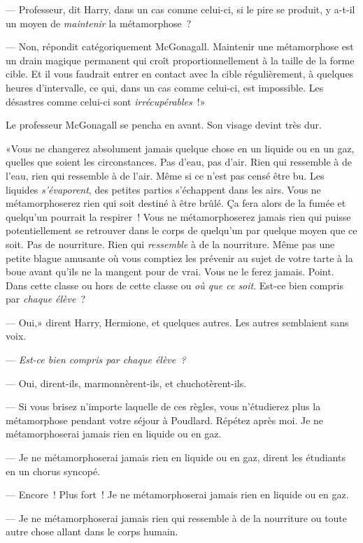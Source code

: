 --- Professeur, dit Harry, dans un cas comme celui-ci, si le pire se produit, y a-t-il un moyen de \emph{maintenir} la métamorphose~?

--- Non, répondit catégoriquement McGonagall. Maintenir une métamorphose est un drain magique permanent qui croît proportionnellement à la taille de la forme cible. Et il vous faudrait entrer en contact avec la cible régulièrement, à quelques heures d'intervalle, ce qui, dans un cas comme celui-ci, est impossible. Les désastres comme celui-ci sont \emph{irrécupérables}~!»

Le professeur McGonagall se pencha en avant. Son visage devint très dur.

«Vous ne changerez absolument jamais quelque chose en un liquide ou en un gaz, quelles que soient les circonstances. Pas d'eau, pas d'air. Rien qui ressemble à de l'eau, rien qui ressemble à de l'air. Même si ce n'est pas censé être bu. Les liquides \emph{s'évaporent}, des petites parties s'échappent dans les airs. Vous ne métamorphoserez rien qui soit destiné à être brûlé. Ça fera alors de la fumée et quelqu'un pourrait la respirer~! Vous ne métamorphoserez jamais rien qui puisse potentiellement se retrouver dans le corps de quelqu'un par quelque moyen que ce soit. Pas de nourriture. Rien qui \emph{ressemble} à de la nourriture. Même pas une petite blague amusante où vous comptiez les prévenir au sujet de votre tarte à la boue avant qu'ils ne la mangent pour de vrai. Vous ne le ferez jamais. Point. Dans cette classe ou hors de cette classe ou \emph{où que ce soit}. Est-ce bien compris par \emph{chaque élève}~?

--- Oui,» dirent Harry, Hermione, et quelques autres. Les autres semblaient sans voix.

--- \emph{Est-ce bien compris par chaque élève~?}

--- Oui, dirent-ils, marmonnèrent-ils, et chuchotèrent-ils.

--- Si vous brisez n'importe laquelle de ces règles, vous n'étudierez plus la métamorphose pendant votre séjour à Poudlard. Répétez après moi. Je ne métamorphoserai jamais rien en liquide ou en gaz.

--- Je ne métamorphoserai jamais rien en liquide ou en gaz, dirent les étudiants en un chorus syncopé.

--- Encore~! Plus fort~! Je ne métamorphoserai jamais rien en liquide ou en gaz.

--- Je ne métamorphoserai jamais rien qui ressemble à de la nourriture ou toute autre chose allant dans le corps humain.

